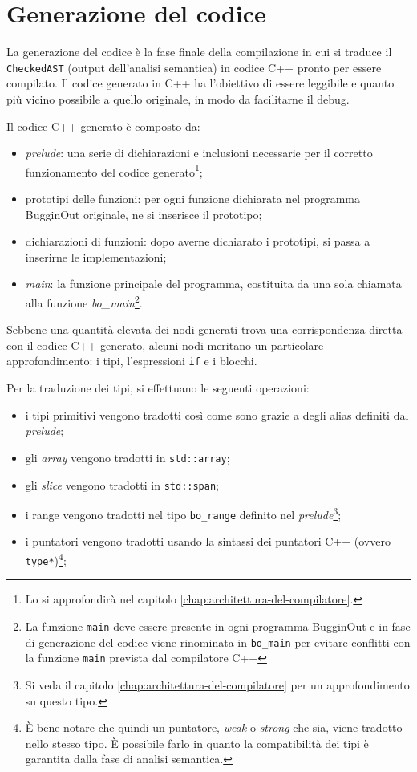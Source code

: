 \section{Generazione del codice}
\label{sec:generazione-del-codice}

La generazione del codice \`e la fase finale della compilazione in cui si traduce il \texttt{CheckedAST} (output dell'analisi semantica) in codice C++ pronto per essere compilato. Il codice generato in C++ ha l'obiettivo di essere leggibile e quanto pi\`u vicino possibile a quello originale, in modo da facilitarne il debug.

Il codice C++ generato \`e composto da:
\begin{itemize}
	\item \emph{prelude}: una serie di dichiarazioni e inclusioni necessarie per il corretto funzionamento del codice generato\footnote{Lo si approfondir\`a nel capitolo \ref{chap:architettura-del-compilatore}.};
	\item prototipi delle funzioni: per ogni funzione dichiarata nel programma BugginOut originale, ne si inserisce il prototipo;
	\item dichiarazioni di funzioni: dopo averne dichiarato i prototipi, si passa a inserirne le implementazioni;
	\item \emph{main}: la funzione principale del programma, costituita da una sola chiamata alla funzione \emph{bo\_main}\footnote{La funzione \texttt{main} deve essere presente in ogni programma BugginOut e in fase di generazione del codice viene rinominata in \texttt{bo\_main} per evitare conflitti con la funzione \texttt{main} prevista dal compilatore C++}.
\end{itemize}

Sebbene una quantit\`a elevata dei nodi generati trova una corrispondenza diretta con il codice C++ generato, alcuni nodi meritano un particolare approfondimento: i tipi, l'espressioni \texttt{if} e i blocchi.

Per la traduzione dei tipi, si effettuano le seguenti operazioni:
\begin{itemize}
	\item i tipi primitivi vengono tradotti cos\`i come sono grazie a degli alias definiti dal \emph{prelude};
	\item gli \emph{array} vengono tradotti in \texttt{std::array};
	\item gli \emph{slice} vengono tradotti in \texttt{std::span};
	\item i range vengono tradotti nel tipo \texttt{bo\_range} definito nel \emph{prelude}\footnote{Si veda il capitolo \ref{chap:architettura-del-compilatore} per un approfondimento su questo tipo.};
	\item i puntatori vengono tradotti usando la sintassi dei puntatori C++ (ovvero \texttt{type*})\footnote{\`E bene notare che quindi un puntatore, \emph{weak} o \emph{strong} che sia, viene tradotto nello stesso tipo. \`E possibile farlo in quanto la compatibilit\`a dei tipi \`e garantita dalla fase di analisi semantica.};
\end{itemize}

